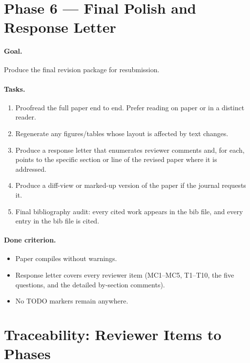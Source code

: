\documentclass[11pt]{article}
\begin{document}
\section{Phase 6 --- Final Polish and Response Letter}
\label{sec:phase6}

\paragraph{Goal.} Produce the final revision package for resubmission.

\paragraph{Tasks.}
\begin{enumerate}[leftmargin=*]
\item Proofread the full paper end to end. Prefer reading on paper or in a distinct reader.
\item Regenerate any figures/tables whose layout is affected by text changes.
\item Produce a response letter that enumerates reviewer comments and, for each, points to the specific section or line of the revised paper where it is addressed.
\item Produce a diff-view or marked-up version of the paper if the journal requests it.
\item Final bibliography audit: every cited work appears in the bib file, and every entry in the bib file is cited.
\end{enumerate}

\paragraph{Done criterion.}
\begin{itemize}[leftmargin=*]
\item Paper compiles without warnings.
\item Response letter covers every reviewer item (MC1--MC5, T1--T10, the five questions, and the detailed by-section comments).
\item No TODO markers remain anywhere.
\end{itemize}

\section{Traceability: Reviewer Items to Phases}
\end{document}
